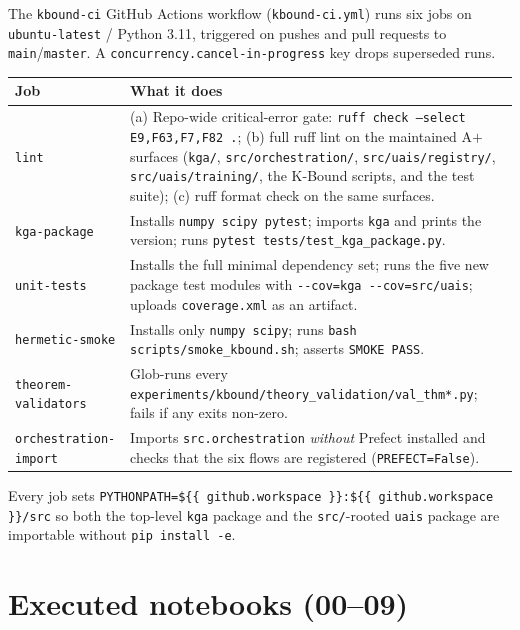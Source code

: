 The \texttt{kbound-ci} GitHub Actions workflow (\texttt{kbound-ci.yml}) runs
six jobs on \texttt{ubuntu-latest} / Python 3.11, triggered on pushes and
pull requests to \texttt{main}/\texttt{master}.  A
\texttt{concurrency.cancel-in-progress} key drops superseded runs.

\begin{center}
\begin{tabular}{lp{9cm}}
\toprule
Job & What it does \\
\midrule
\texttt{lint} &
  (a) Repo-wide critical-error gate: \texttt{ruff check --select E9,F63,F7,F82 .};
  (b) full ruff lint on the maintained A$+$ surfaces (\texttt{kga/},
  \texttt{src/orchestration/}, \texttt{src/uais/registry/},
  \texttt{src/uais/training/}, the K-Bound scripts, and the test suite);
  (c) ruff format check on the same surfaces. \\[4pt]
\texttt{kga-package} &
  Installs \texttt{numpy scipy pytest}; imports \texttt{kga} and prints
  the version; runs \texttt{pytest tests/test\_kga\_package.py}. \\[4pt]
\texttt{unit-tests} &
  Installs the full minimal dependency set; runs the five new package test
  modules with \texttt{-{}-cov=kga -{}-cov=src/uais}; uploads
  \texttt{coverage.xml} as an artifact. \\[4pt]
\texttt{hermetic-smoke} &
  Installs only \texttt{numpy scipy}; runs
  \texttt{bash scripts/smoke\_kbound.sh}; asserts \texttt{SMOKE PASS}. \\[4pt]
\texttt{theorem-validators} &
  Glob-runs every \texttt{experiments/kbound/theory\_validation/val\_thm*.py};
  fails if any exits non-zero. \\[4pt]
\texttt{orchestration-import} &
  Imports \texttt{src.orchestration} \emph{without} Prefect installed and
  checks that the six flows are registered (\texttt{PREFECT=False}). \\
\bottomrule
\end{tabular}
\end{center}

Every job sets \texttt{PYTHONPATH=\$\{\{ github.workspace \}\}:\$\{\{
github.workspace \}\}/src} so both the top-level \texttt{kga} package and the
\texttt{src/}-rooted \texttt{uais} package are importable without \texttt{pip
install -e}.

\section{Executed notebooks (00--09)}
\label{sec:app-repro-notebooks}

